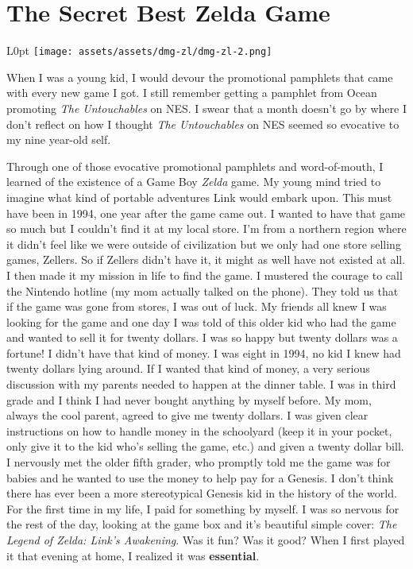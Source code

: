 \documentclass{book}
\begin{document}
\newpage\FloatBarrier\needspace{10mm}\section*{The Secret Best Zelda Game}\nopagebreak[4]
\begin{wrapfigure}{L}{0pt} \texttt{[image: assets/assets/dmg-zl/dmg-zl-2.png]}\end{wrapfigure}
When I was a young kid, I would devour the promotional pamphlets that came with every new game I got. I still remember getting a pamphlet from Ocean promoting \emph{The Untouchables} on NES. I swear that a month doesn’t go by where I don’t reflect on how I thought \emph{The Untouchables} on NES seemed so evocative to my nine year-old self.

Through one of those evocative promotional pamphlets and word-of-mouth, I learned of the existence of a Game Boy \emph{Zelda} game. My young mind tried to imagine what kind of portable adventures Link would embark upon. This must have been in 1994, one year after the game came out. I wanted to have that game so much but I couldn’t find it at my local store. I’m from a northern region where it didn’t feel like we were outside of civilization but we only had one store selling games, Zellers. So if Zellers didn’t have it, it might as well have not existed at all. I then made it my mission in life to find the game. I mustered the courage to call the Nintendo hotline (my mom actually talked on the phone). They told us that if the game was gone from stores, I was out of luck. My friends all knew I was looking for the game and one day I was told of this older kid who had the game and wanted to sell it for twenty dollars. I was so happy but twenty dollars was a fortune! I didn’t have that kind of money. I was eight in 1994, no kid I knew had twenty dollars lying around. If I wanted that kind of money, a very serious discussion with my parents needed to happen at the dinner table. I was in third grade and I think I had never bought anything by myself before. My mom, always the cool parent, agreed to give me twenty dollars. I was given clear instructions on how to handle money in the schoolyard (keep it in your pocket, only give it to the kid who’s selling the game, etc.) and given a twenty dollar bill. I nervously met the older fifth grader, who promptly told me the game was for babies and he wanted to use the money to help pay for a Genesis. I don’t think there has ever been a more stereotypical Genesis kid in the history of the world. For the first time in my life, I paid for something by myself. I was so nervous for the rest of the day, looking at the game box and it’s beautiful simple cover: \emph{The Legend of Zelda: Link’s Awakening}. Was it fun? Was it good? When I first played it that evening at home, I realized it was \textbf{essential}.
\end{document}
